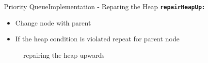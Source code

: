 \begin{frame}{Priority Queue}{Implementation - Reparing the Heap}
  {\color{Mittel-Blau}\texttt{\textbf{repairHeapUp:}}}
  \begin{itemize}
    \item<2->
      Change node with parent
    \item<3->
      If the {\color{Mittel-Blau}heap condition} is violated repeat for parent
      node
  \end{itemize}
  \begin{center}
    \begin{figure}[!h]%
      \begin{columns}%
        \begin{column}{0.45\linewidth}%
          \begin{adjustbox}{width=\linewidth}%
          \end{adjustbox}%
        \end{column}%
        \begin{column}{0.45\linewidth}%
          \begin{adjustbox}{width=\linewidth}%
          \end{adjustbox}%
        \end{column}%
      \end{columns}%
      \caption{repairing the heap upwards}%
      \label{fig:priority_queue:impl_repair_heap_up}%
    \end{figure}
  \end{center}
\end{frame}


